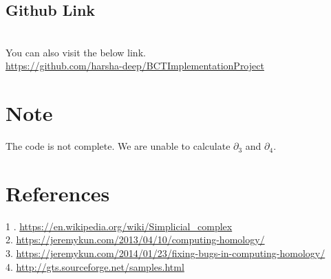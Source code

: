 \documentclass[11pt]{article}
\begin{document}
\subsection{Github Link} \\
You can also visit the below link. \\
\url{https://github.com/harsha-deep/BCTImplementationProject}

\section{Note}
The code is not complete. We are unable to calculate $\partial_3$ and $\partial_4$. 

\section{References}
1 . \url{https://en.wikipedia.org/wiki/Simplicial_complex} \\
2. \url{https://jeremykun.com/2013/04/10/computing-homology/} \\
3. \url{https://jeremykun.com/2014/01/23/fixing-bugs-in-computing-homology/} \\
4. \url{http://gts.sourceforge.net/samples.html}
\end{document}
